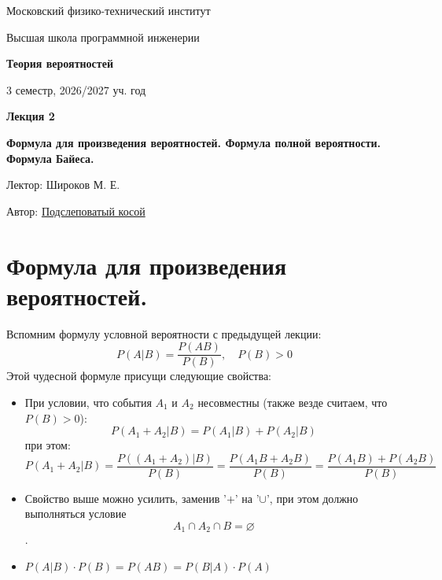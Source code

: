 \documentclass[11pt]{article}
\newcommand{\semester}{3 семестр, 2026/2027 уч. год}
\begin{document}
\begin{titlepage}
    \centering
    
    {\large Московский физико-технический институт \par}
    {\large Высшая школа программной инженерии \par}
    \vspace{2cm}

    {\Large \textbf{Теория вероятностей} \par}
    {\large \semester \par}
    
    \vspace*{\fill}

    {\Huge \textbf{Лекция 2} \par}
    {\Huge \textbf{Формула для произведения вероятностей. Формула полной вероятности. \\ Формула Байеса. } \par}
    
    \vspace*{\fill}
    
    {\large Лектор: Широков М. Е. \par}
    {\large Автор: \href{https://t.me/lost_luna}{Подслеповатый косой} \par}

\end{titlepage}


\section{Формула для произведения вероятностей.}

Вспомним формулу условной вероятности с предыдущей лекции: \[P(A | B) = \frac{P(A B)}{P(B)}, \quad P(B) > 0\]
\leavevmode
Этой чудесной формуле присущи следующие свойства:

\begin{itemize}
    \item При условии, что события $A_1$ и $A_2$ несовместны (также везде считаем, что $P(B) > 0$): \[P(A_1 + A_2 | B) = P(A_1 | B) + P(A_2 | B)\]
    при этом: \[P(A_1 + A_2 | B) = \frac{P((A_1 + A_2) | B)}{P(B)} = \frac{P(A_1 B + A_2 B)}{P(B)} = \frac{P(A_1 B) + P(A_2 B)}{P(B)}\]

    \item Свойство выше можно усилить, заменив '$+$' на '$\cup$', при этом должно выполняться условие \[ A_1 \cap A_2 \cap B = \varnothing \].
    
    \item $P(A | B) \cdot P(B) = P(A B) = P(B | A) \cdot P(A)$
\end{itemize}
\end{document}
